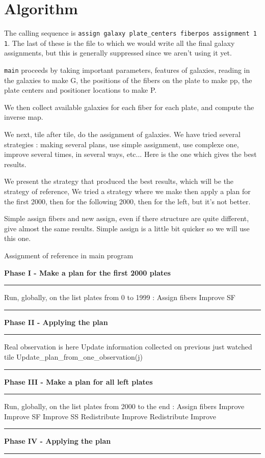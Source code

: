 \documentclass{extarticle}
\newcommand\Algphasee[1]{%
\Statex\hspace*{-\algorithmicindent}\textbf{#1}%
\vspace*{-.7\baselineskip}\Statex\hspace*{\dimexpr-\algorithmicindent-2pt\relax}\rule{\linewidth}{0.4pt}%
}
\newcommand\Algphase[1]{%
\vspace*{-.7\baselineskip}\Statex\hspace*{\dimexpr-\algorithmicindent-2pt\relax}\rule{\linewidth}{0.4pt}%
\Statex\hspace*{-\algorithmicindent}\textbf{#1}%
\vspace*{-.7\baselineskip}\Statex\hspace*{\dimexpr-\algorithmicindent-2pt\relax}\rule{\linewidth}{0.4pt}%
}
\begin{document}
\section{Algorithm}

The calling sequence is {\tt assign galaxy plate\_centers fiberpos assignment 1 1}. The last of these is the file to which we would write all the final galaxy assignments, but this is generally suppressed since we aren't using it yet.

 {\tt main} proceeds by taking important parameters, features of galaxies, reading in the galaxies to make G, the positions of the fibers on the plate to make pp, the plate centers and positioner locations to make P. 
 
We then collect available galaxies for each fiber for each plate, and compute the inverse map.
 
We next, tile after tile, do the assignment of galaxies. We have tried several strategies : making several plans, use simple assignment, use complexe one, improve several times, in several ways, etc... Here is the one which gives the best results.

We present the strategy that produced the best results, which will be the strategy of reference,
We tried a strategy where we make then apply a plan for the first 2000, then for the following 2000, then for the left, but it's not better.

Simple assign fibers and new assign, even if there structure are quite different, give almost the same results. Simple assign is a little bit quicker so we will use this one.

\begin{algorithm}[H]
	\caption{Assignment of reference in main program}\label{euclid}
	\begin{algorithmic}[1]
		\Algphasee{Phase I - Make a plan for the first 2000 plates}
		\State Run, globally, on the list plates from 0 to 1999 :
		\State Assign fibers
		\State Improve SF
	\end{algorithmic}
	\begin{algorithmic}[1]
		\Algphase{Phase II - Applying the plan}
		\State Real observation is here
		\State Update information collected on previous just watched tile
		\State Update\_plan\_from\_one\_observation(j)
		\EndFor
	\end{algorithmic}

	\begin{algorithmic}[1]
		\Algphase{Phase III - Make a plan for all left plates}
		\State Run, globally, on the list plates from 2000 to the end :
		\State Assign fibers
		\State Improve
		\State Improve SF
		\State Improve SS
		\State Redistribute
		\State Improve
		\State Redistribute
		\State Improve
	\end{algorithmic}

	\begin{algorithmic}[1]
		\Algphase{Phase IV - Applying the plan}
	\end{algorithmic}
\end{algorithm}
\end{document}
